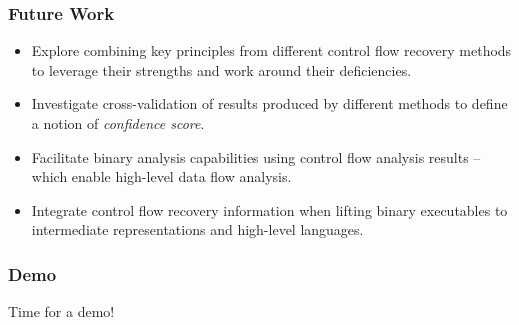 \documentclass[aspectratio=1610]{beamer}
\begin{document}
\begin{frame}
	\frametitle{Future Work}




	\begin{itemize}
		\item Explore combining key principles from different control flow recovery methods to leverage their strengths and work around their deficiencies.
		\item Investigate cross-validation of results produced by different methods to define a notion of \textit{confidence score}.
		\item Facilitate binary analysis capabilities using control flow analysis results -- which enable high-level data flow analysis.
		\item Integrate control flow recovery information when lifting binary executables to intermediate representations and high-level languages.
	\end{itemize}

%


\end{frame}

\begin{frame}
	\frametitle{Demo}



Time for a demo!


\end{frame}
\end{document}
